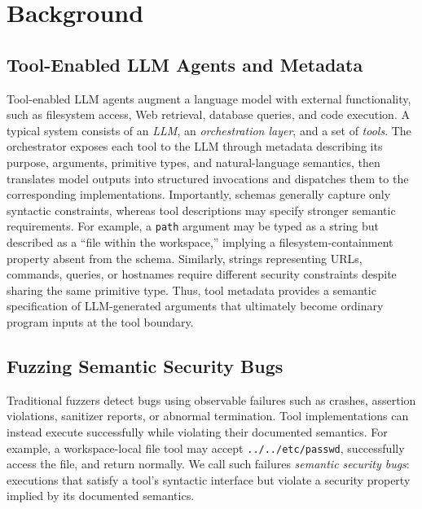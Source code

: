 
\section{Background}
\label{sec:background}

\subsection{Tool-Enabled LLM Agents and Metadata}

Tool-enabled LLM agents augment a language model with external functionality,
such as filesystem access, Web retrieval, database queries, and code execution.
A typical system consists of an \emph{LLM}, an \emph{orchestration layer}, and
a set of \emph{tools}. The orchestrator exposes each tool to the LLM through
metadata describing its purpose, arguments, primitive types, and
natural-language semantics, then translates model outputs into structured
invocations and dispatches them to the corresponding implementations.
Importantly, schemas generally capture only syntactic constraints, whereas
tool descriptions may specify stronger semantic requirements. For example, a
\texttt{path} argument may be typed as a string but described as a ``file
within the workspace,'' implying a filesystem-containment property absent from
the schema. Similarly, strings representing URLs, commands, queries, or
hostnames require different security constraints despite sharing the same
primitive type. Thus, tool metadata provides a semantic specification of
LLM-generated arguments that ultimately become ordinary program inputs at the
tool boundary.

\subsection{Fuzzing Semantic Security Bugs}

Traditional fuzzers detect bugs using observable failures such as crashes,
assertion violations, sanitizer reports, or abnormal termination. Tool
implementations can instead execute successfully while violating their
documented semantics. For example, a workspace-local file tool may accept
\texttt{../../etc/passwd}, successfully access the file, and return normally.
We call such failures \emph{semantic security bugs}: executions that satisfy a
tool's syntactic interface but violate a security property implied by its
documented semantics.


